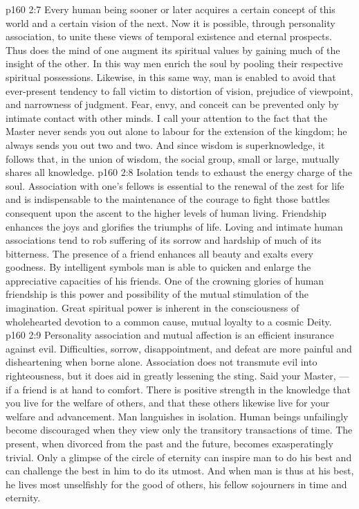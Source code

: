 \vs p160 2:7 \bibnobreakspace {} Every human being sooner or later acquires a certain concept of this world and a certain vision of the next. Now it is possible, through personality association, to unite these views of temporal existence and eternal prospects. Thus does the mind of one augment its spiritual values by gaining much of the insight of the other. In this way men enrich the soul by pooling their respective spiritual possessions. Likewise, in this same way, man is enabled to avoid that ever\hyp{}present tendency to fall victim to distortion of vision, prejudice of viewpoint, and narrowness of judgment. Fear, envy, and conceit can be prevented only by intimate contact with other minds. I call your attention to the fact that the Master never sends you out alone to labour for the extension of the kingdom; he always sends you out two and two. And since wisdom is superknowledge, it follows that, in the union of wisdom, the social group, small or large, mutually shares all knowledge.
\vs p160 2:8 \bibnobreakspace {} Isolation tends to exhaust the energy charge of the soul. Association with one’s fellows is essential to the renewal of the zest for life and is indispensable to the maintenance of the courage to fight those battles consequent upon the ascent to the higher levels of human living. Friendship enhances the joys and glorifies the triumphs of life. Loving and intimate human associations tend to rob suffering of its sorrow and hardship of much of its bitterness. The presence of a friend enhances all beauty and exalts every goodness. By intelligent symbols man is able to quicken and enlarge the appreciative capacities of his friends. One of the crowning glories of human friendship is this power and possibility of the mutual stimulation of the imagination. Great spiritual power is inherent in the consciousness of wholehearted devotion to a common cause, mutual loyalty to a cosmic Deity.
\vs p160 2:9 \bibnobreakspace {} Personality association and mutual affection is an efficient insurance against evil. Difficulties, sorrow, disappointment, and defeat are more painful and disheartening when borne alone. Association does not transmute evil into righteousness, but it does aid in greatly lessening the sting. Said your Master,  --- if a friend is at hand to comfort. There is positive strength in the knowledge that you live for the welfare of others, and that these others likewise live for your welfare and advancement. Man languishes in isolation. Human beings unfailingly become discouraged when they view only the transitory transactions of time. The present, when divorced from the past and the future, becomes exasperatingly trivial. Only a glimpse of the circle of eternity can inspire man to do his best and can challenge the best in him to do its utmost. And when man is thus at his best, he lives most unselfishly for the good of others, his fellow sojourners in time and eternity.
